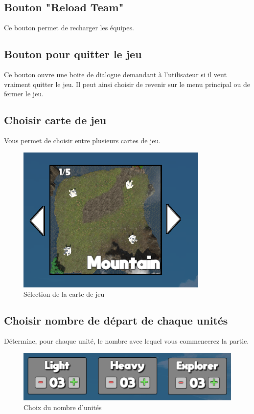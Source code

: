 \documentclass{report}
\begin{document}
\subsection{Bouton "Reload Team"}
Ce bouton permet de recharger les équipes.
\subsection{Bouton pour quitter le jeu}
Ce bouton ouvre une boite de dialogue demandant à l'utilisateur si il veut vraiment quitter le jeu. Il peut ainsi choisir de revenir sur le menu principal ou de fermer le jeu.
\subsection{Choisir carte de jeu}
Vous permet de choisir entre plusieurs cartes de jeu.

\begin{figure}[!h]
	\centering
		\includegraphics[scale=0.80]{Selection_Map}
	\caption{Sélection de la carte de jeu}
\end{figure}
\subsection{Choisir nombre de départ de chaque unités}
Détermine, pour chaque unité, le nombre avec lequel vous commencerez la partie.

\begin{figure}[!h]
	\centering
		\includegraphics[scale=0.80]{Nombre_Unit}
	\caption{Choix du nombre d'unités}
\end{figure}
\end{document}

